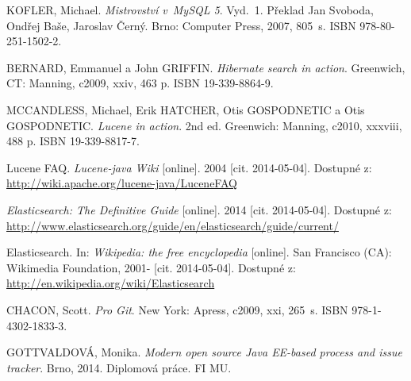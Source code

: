 \documentclass[11pt,oneside]{fithesis2}
\begin{document}
\begin{thebibliography}{1}

KOFLER, Michael. \textit{Mistrovství v~MySQL 5}. Vyd.~1. Překlad Jan Svoboda, Ondřej Baše, Jaroslav Černý. Brno: Computer Press, 2007, 805~s. ISBN 978-80-251-1502-2. 

BERNARD, Emmanuel a John GRIFFIN. \textit{Hibernate search in action}. Greenwich, CT: Manning, c2009, xxiv, 463 p. ISBN 19-339-8864-9. 

MCCANDLESS, Michael, Erik HATCHER, Otis GOSPODNETIC a Otis GOSPODNETIC. \textit{Lucene in action}. 2nd ed. Greenwich: Manning, c2010, xxxviii, 488 p. ISBN 19-339-8817-7. 

Lucene FAQ. \textit{Lucene-java Wiki} [online]. 2004 [cit. 2014-05-04]. Dostupné z: \url{http://wiki.apache.org/lucene-java/LuceneFAQ}

\textit{Elasticsearch: The Definitive Guide} [online]. 2014 [cit. 2014-05-04]. Dostupné z: \url{http://www.elasticsearch.org/guide/en/elasticsearch/guide/current/}

Elasticsearch. In: \textit{Wikipedia: the free encyclopedia} [online]. San Francisco (CA): Wikimedia Foundation, 2001- [cit. 2014-05-04]. Dostupné z: \url{http://en.wikipedia.org/wiki/Elasticsearch}

CHACON, Scott. \textit{Pro Git}. New York: Apress, c2009, xxi, 265~s. ISBN 978-1-4302-1833-3. 

GOTTVALDOVÁ, Monika. \textit{Modern open source Java EE-based process and issue tracker}. Brno, 2014. Diplomová práce. FI MU.


\end{thebibliography}

\endgroup

\appendix

\end{document}
